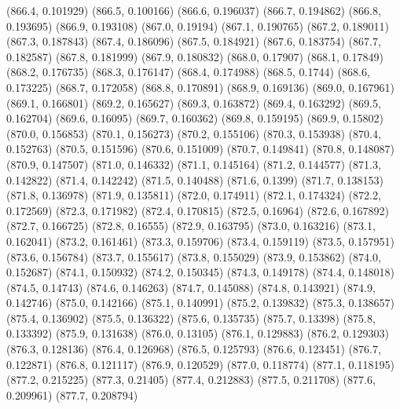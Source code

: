 {					(866.4, 0.101929)
					(866.5, 0.100166)
					(866.6, 0.196037)
					(866.7, 0.194862)
					(866.8, 0.193695)
					(866.9, 0.193108)
					(867.0, 0.19194)
					(867.1, 0.190765)
					(867.2, 0.189011)
					(867.3, 0.187843)
					(867.4, 0.186096)
					(867.5, 0.184921)
					(867.6, 0.183754)
					(867.7, 0.182587)
					(867.8, 0.181999)
					(867.9, 0.180832)
					(868.0, 0.17907)
					(868.1, 0.17849)
					(868.2, 0.176735)
					(868.3, 0.176147)
					(868.4, 0.174988)
					(868.5, 0.1744)
					(868.6, 0.173225)
					(868.7, 0.172058)
					(868.8, 0.170891)
					(868.9, 0.169136)
					(869.0, 0.167961)
					(869.1, 0.166801)
					(869.2, 0.165627)
					(869.3, 0.163872)
					(869.4, 0.163292)
					(869.5, 0.162704)
					(869.6, 0.16095)
					(869.7, 0.160362)
					(869.8, 0.159195)
					(869.9, 0.15802)
					(870.0, 0.156853)
					(870.1, 0.156273)
					(870.2, 0.155106)
					(870.3, 0.153938)
					(870.4, 0.152763)
					(870.5, 0.151596)
					(870.6, 0.151009)
					(870.7, 0.149841)
					(870.8, 0.148087)
					(870.9, 0.147507)
					(871.0, 0.146332)
					(871.1, 0.145164)
					(871.2, 0.144577)
					(871.3, 0.142822)
					(871.4, 0.142242)
					(871.5, 0.140488)
					(871.6, 0.1399)
					(871.7, 0.138153)
					(871.8, 0.136978)
					(871.9, 0.135811)
					(872.0, 0.174911)
					(872.1, 0.174324)
					(872.2, 0.172569)
					(872.3, 0.171982)
					(872.4, 0.170815)
					(872.5, 0.16964)
					(872.6, 0.167892)
					(872.7, 0.166725)
					(872.8, 0.16555)
					(872.9, 0.163795)
					(873.0, 0.163216)
					(873.1, 0.162041)
					(873.2, 0.161461)
					(873.3, 0.159706)
					(873.4, 0.159119)
					(873.5, 0.157951)
					(873.6, 0.156784)
					(873.7, 0.155617)
					(873.8, 0.155029)
					(873.9, 0.153862)
					(874.0, 0.152687)
					(874.1, 0.150932)
					(874.2, 0.150345)
					(874.3, 0.149178)
					(874.4, 0.148018)
					(874.5, 0.14743)
					(874.6, 0.146263)
					(874.7, 0.145088)
					(874.8, 0.143921)
					(874.9, 0.142746)
					(875.0, 0.142166)
					(875.1, 0.140991)
					(875.2, 0.139832)
					(875.3, 0.138657)
					(875.4, 0.136902)
					(875.5, 0.136322)
					(875.6, 0.135735)
					(875.7, 0.13398)
					(875.8, 0.133392)
					(875.9, 0.131638)
					(876.0, 0.13105)
					(876.1, 0.129883)
					(876.2, 0.129303)
					(876.3, 0.128136)
					(876.4, 0.126968)
					(876.5, 0.125793)
					(876.6, 0.123451)
					(876.7, 0.122871)
					(876.8, 0.121117)
					(876.9, 0.120529)
					(877.0, 0.118774)
					(877.1, 0.118195)
					(877.2, 0.215225)
					(877.3, 0.21405)
					(877.4, 0.212883)
					(877.5, 0.211708)
					(877.6, 0.209961)
					(877.7, 0.208794)
}

